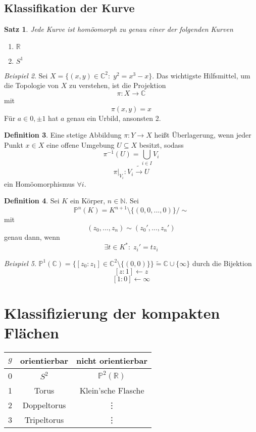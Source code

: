 \documentclass[a4paper, 12pt]{article}
\theoremstyle{plain}
\newtheorem{theorem}{Satz}[section] %
\theoremstyle{definition}
\newtheorem{definition}[theorem]{Definition} %
\theoremstyle{lemma}
\theoremstyle{remark}
\theoremstyle{corollary}
\theoremstyle{example}
\newtheorem{example}[theorem]{Beispiel}
\begin{document}
	\subsection{Klassifikation der Kurve}
	\begin{theorem}
		Jede Kurve ist homöomorph zu genau einer der folgenden Kurven \begin{enumerate}
			\item $\mathbb{R}$
			\item $S^1$
		\end{enumerate}
	\end{theorem}
	\begin{example}
		Sei $X = \{(x,y) \in \mathbb{C}^2 : \; y^2 = x^3 - x\}$. Das wichtigste Hilfsmittel, um die Topologie von $X$ zu verstehen, ist die Projektion \[\pi: X \to \mathbb{C}\] mit \[\pi(x,y) = x\] Für $a \in {0, \pm 1}$ hat $a$ genau ein Urbild, ansonsten 2.
	\end{example}
	\begin{definition}
		Eine stetige Abbildung $\pi:Y \to X$ heißt Überlagerung, wenn jeder Punkt $x \in X$ eine offene Umgebung $U \subseteq X$ besitzt, sodass \[\pi^{-1}(U) = \bigcup_{i \in I} V_i\] \[\pi|_{V_i} : V_i \tilde{\rightarrow} U\] ein Homöomorphismus $\forall i$. 
	\end{definition}
	\begin{definition}
		Sei $K$ ein Körper, $n \in \mathbb{N}$. Sei \[\mathbb{P}^n(K) = K^{n+1}\setminus\{(0,0,...,0)\}/\sim\]
		mit \[(z_0,...,z_n) \sim (z_0',...,z_n')\] genau dann, wenn \[\exists t \in K^* : \; z_i' = tz_i\]
	\end{definition}
	\begin{example}
		$\mathbb{P}^1(\mathbb{C}) = \{[z_0:z_1] \in \mathbb{C}^2 \setminus \{(0,0)\}\} \tilde{=} \mathbb{C} \cup \{\infty\}$ durch die Bijektion \[[z:1] \leftarrow z\]
		\[[1:0] \leftarrow \infty\]
	\end{example}
	\section{Klassifizierung der kompakten Flächen}
	\begin{table}[h]
		\centering
		\begin{tabular}{c | c | c}
			$g$ & orientierbar & nicht orientierbar\\
			\hline \hline
			0 & $S^2$ & $\mathbb{P}^2(\mathbb{R})$\\
			1 & Torus & Klein'sche Flasche\\
			2 & Doppeltorus & \vdots\\
			3 & Tripeltorus & \vdots
		\end{tabular}
	\end{table}
\end{document}
